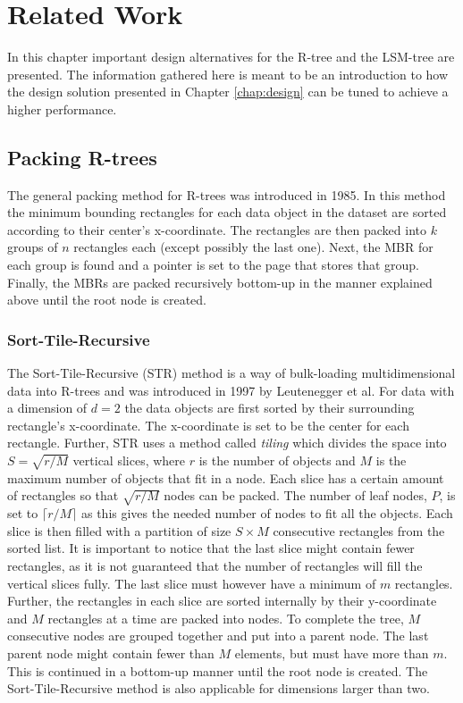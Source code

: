 \chapter{Related Work}

\noindent
In this chapter important design alternatives for the R-tree and the LSM-tree are presented. The information gathered here is meant to be an introduction to how the design solution presented in Chapter \ref{chap:design} can be tuned to achieve a higher performance. 


\section{Packing R-trees}
The general packing method for R-trees was introduced in 1985\cite{DirectSpatialSearch}. In this method the minimum bounding rectangles for each data object in the dataset are sorted according to their center's x-coordinate. The rectangles are then packed into $k$ groups of $n$ rectangles each (except possibly the last one). Next, the MBR for each group is found and a pointer is set to the page that stores that group. Finally, the MBRs are packed recursively bottom-up in the manner explained above until the root node is created. 

\subsection{Sort-Tile-Recursive}
The Sort-Tile-Recursive (STR) method is a way of bulk-loading multidimensional data into R-trees and was introduced in 1997 by Leutenegger et al\cite{STR}. For data with a dimension of $d=2$ the data objects are first sorted by their surrounding rectangle's x-coordinate. The x-coordinate is set to be the center for each rectangle. Further, STR uses a method called \emph{tiling} which divides the space into $S = \sqrt{r/M}$ vertical slices, where $r$ is the number of objects and $M$ is the maximum number of objects that fit in a node. Each slice has a certain amount of rectangles so that $\sqrt{r/M}$ nodes can be packed. The number of leaf nodes, $P$, is set to $\lceil{r/M}\rceil$ as this gives the needed number of nodes to fit all the objects. Each slice is then filled with a partition of size $S \times M$ consecutive rectangles from the sorted list. It is important to notice that the last slice might contain fewer rectangles, as it is not guaranteed that the number of rectangles will fill the vertical slices fully. The last slice must however have a minimum of $m$ rectangles. Further, the rectangles in each slice are sorted internally by their y-coordinate and $M$ rectangles at a time are packed into nodes. To complete the tree, $M$ consecutive nodes are grouped together and put into a parent node. The last parent node might contain fewer than $M$ elements, but must have more than $m$. This is continued in a bottom-up manner until the root node is created. The Sort-Tile-Recursive method is also applicable for dimensions larger than two. \newline

